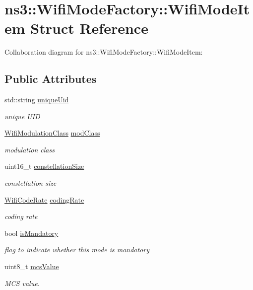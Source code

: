 \hypertarget{structns3_1_1WifiModeFactory_1_1WifiModeItem}{}\section{ns3\+:\+:Wifi\+Mode\+Factory\+:\+:Wifi\+Mode\+Item Struct Reference}
\label{structns3_1_1WifiModeFactory_1_1WifiModeItem}


Collaboration diagram for ns3\+:\+:Wifi\+Mode\+Factory\+:\+:Wifi\+Mode\+Item\+:
\subsection*{Public Attributes}
\begin{DoxyCompactItemize}
\item 
std\+::string \hyperlink{structns3_1_1WifiModeFactory_1_1WifiModeItem_a5aa9c918544ecb7514e0e7d0f9721c5e}{unique\+Uid}
\begin{DoxyCompactList}\small\item\em unique U\+ID \end{DoxyCompactList}\item 
\hyperlink{namespacens3_aa999e1221606a2b21b1eb33c2007c217}{Wifi\+Modulation\+Class} \hyperlink{structns3_1_1WifiModeFactory_1_1WifiModeItem_a0fce98678066197ced8149610525c018}{mod\+Class}
\begin{DoxyCompactList}\small\item\em modulation class \end{DoxyCompactList}\item 
uint16\+\_\+t \hyperlink{structns3_1_1WifiModeFactory_1_1WifiModeItem_ab2eeabee2c139ad932dcac02afc2928d}{constellation\+Size}
\begin{DoxyCompactList}\small\item\em constellation size \end{DoxyCompactList}\item 
\hyperlink{namespacens3_aeaf3a86fd4bdb7829955238fba43e2ad}{Wifi\+Code\+Rate} \hyperlink{structns3_1_1WifiModeFactory_1_1WifiModeItem_a91cce9c5beef9c8a7fca90238cd93c53}{coding\+Rate}
\begin{DoxyCompactList}\small\item\em coding rate \end{DoxyCompactList}\item 
bool \hyperlink{structns3_1_1WifiModeFactory_1_1WifiModeItem_a68457ddea74452573f50e568dfe2eb07}{is\+Mandatory}
\begin{DoxyCompactList}\small\item\em flag to indicate whether this mode is mandatory \end{DoxyCompactList}\item 
uint8\+\_\+t \hyperlink{structns3_1_1WifiModeFactory_1_1WifiModeItem_a32576c10e5f08dade306d5701a0788db}{mcs\+Value}
\begin{DoxyCompactList}\small\item\em M\+CS value. \end{DoxyCompactList}\end{DoxyCompactItemize}


